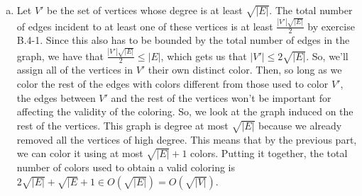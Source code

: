 \documentclass{article}
\begin{document}
\begin{enumerate}[a.]
\item
Let $V'$ be the set of vertices whose degree is at least $\sqrt{|E|}$. The total number of edges incident to at least one of these vertices is at least $\frac{|V'|\sqrt{|E|}}{2}$ by exercise B.4-1. Since this also has to be bounded by the total number of edges in the graph, we have that $\frac{|V'|\sqrt{|E|}}{2} \le |E|$, which gets us that $|V'| \le 2\sqrt{|E|}$. So, we'll assign all of the vertices in $V'$ their own distinct color. Then, so long as we color the rest of the edges with colors different from those used to color $V'$, the edges between $V'$ and the rest of the vertices won't be important for affecting the validity of the coloring. So, we look at the graph induced on the rest of the vertices. This graph is degree at most $\sqrt{|E|}$ because we already removed all the vertices of high degree. This means that by the previous part, we can color it using at most $\sqrt{|E|} +1$ colors. Putting it together, the total number of colors used to obtain a valid coloring is $2 \sqrt{|E|} + \sqrt{|E} +1 \in O(\sqrt{|E|}) = O(\sqrt{|V|})$.
\end{enumerate}
\end{document}
